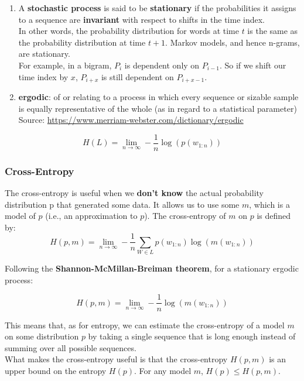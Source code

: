 \begin{enumerate}
    \item A \textbf{stochastic process} is said to be \textbf{stationary} if the probabilities it assigns to a sequence are \textbf{invariant} with respect to shifts in the time index.\\ In other words, the probability distribution for words at time $t$ is the same as the probability distribution at time $t + 1$. Markov models, and hence n-grams, are stationary.\\ For example, in a bigram, $P_i$ is dependent only on $P_{i-1}$. So if we shift our time index by $x$, $P_{i+x}$ is still dependent on $P_{i+x-1}$.
    \item \textbf{ergodic}: of or relating to a process in which every sequence or sizable sample is equally representative of the whole (as in regard to a statistical parameter)\\
    Source: \href{https://www.merriam-webster.com/dictionary/ergodic}{https://www.merriam-webster.com/dictionary/ergodic}
\end{enumerate}

\[
    H(L) = \lim_{n \rightarrow \infty} -\displaystyle\dfrac{1}{n} \log(p(w_{1:n}))
\]

\subsubsection{Cross-Entropy}
The cross-entropy is useful when we \textbf{don’t know} the actual probability distribution p that generated some data. It allows us to use some $m$, which is a model of $p$ (i.e., an approximation to $p$). The
cross-entropy of $m$ on $p$ is defined by:
\[
    H(p,m) = \lim_{n \rightarrow \infty} - \displaystyle\dfrac{1}{n}\sum_{W\in L} p(w_{1:n})\log(m(w_{1:n}))
\]

Following the \textbf{Shannon-McMillan-Breiman theorem}, for a stationary ergodic process:

\[
    H(p,m) = \lim_{n \rightarrow \infty} - \displaystyle\dfrac{1}{n}\log(m(w_{1:n}))
\]

This means that, as for entropy, we can estimate the cross-entropy of a model $m$ on some distribution $p$ by taking a single sequence that is long enough instead of summing over all possible sequences.\\

What makes the cross-entropy useful is that the cross-entropy $H(p,m)$ is an upper bound on the entropy $H(p)$. For any model $m$, \(H(p) \leq H(p,m)\).


